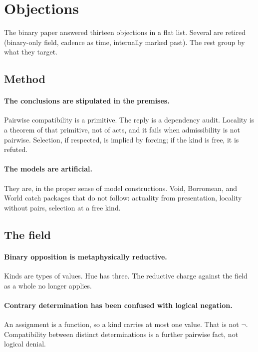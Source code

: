 \documentclass[11pt]{article}
\theoremstyle{definition}
\begin{document}
\section{Objections}

The binary paper answered thirteen objections in a flat list. Several
are retired (binary-only field, cadence as time, internally marked
past). The rest group by what they target.

\subsection{Method}

\paragraph{The conclusions are stipulated in the premises.}
Pairwise compatibility is a primitive. The reply is a dependency
audit. Locality is a theorem of that primitive, not of acts, and it
fails when admissibility is not pairwise. Selection, if respected, is
implied by forcing; if the kind is free, it is refuted.

\paragraph{The models are artificial.}
They are, in the proper sense of model constructions. Void, Borromean,
and World catch packages that do not follow: actuality from
presentation, locality without pairs, selection at a free kind.

\subsection{The field}

\paragraph{Binary opposition is metaphysically reductive.}
Kinds are types of values. Hue has three. The reductive charge against
the field as a whole no longer applies.

\paragraph{Contrary determination has been confused with logical
negation.}
An assignment is a function, so a kind carries at most one value.
That is not $\neg$. Compatibility between distinct determinations is a
further pairwise fact, not logical denial.
\end{document}
